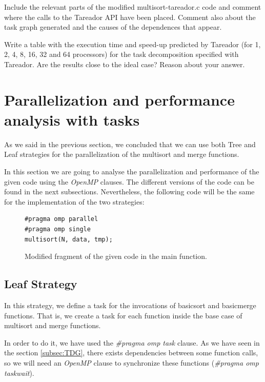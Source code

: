 \documentclass[12pt, a4paper]{article}
\begin{document}
\break

Include the relevant parts of the modified multisort-tareador.c code and comment where the
calls to the Tareador API have been placed. Comment also about the task graph generated and
the causes of the dependences that appear.

Write a table with the execution time and speed-up predicted by Tareador (for 1, 2, 4, 8, 16, 32
and 64 processors) for the task decomposition specified with Tareador. Are the results close to the
ideal case? Reason about your answer.


\section{Parallelization and performance analysis with tasks}

As we said in the previous section, we concluded that we can use both Tree and Leaf strategies for the parallelization of the multisort and merge functions.

In this section we are going to analyse the parallelization and performance of the given code using the \textit{OpenMP} clauses. The different versions of the code can be found in the next subsections. Nevertheless, the following code will be the same for the implementation of the two strategies:

\begin{figure}[H]
\begin{lstlisting}
#pragma omp parallel
#pragma omp single
multisort(N, data, tmp);
\end{lstlisting}

\caption{Modified fragment of the given code in the main function.}
\end{figure}

\subsection{Leaf Strategy}

In this strategy, we define a task for the invocations of basicsort and basicmerge functions. That is, we create a task for each function inside the base case of multisort and merge functions.

In order to do it, we have used the \textit{\#pragma omp task} clause. As we have seen in the section \ref{subsec:TDG}, there exists dependencies between some function calls, so we will need an \textit{OpenMP} clause to synchronize these functions (\textit{\#pragma omp taskwait}).
\end{document}
